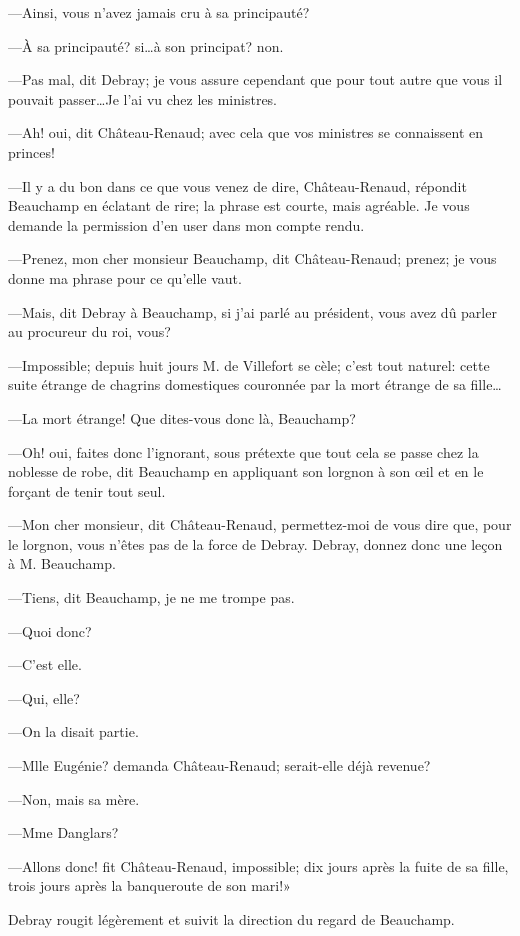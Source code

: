 —Ainsi, vous n'avez jamais cru à sa principauté? 

—À sa principauté? si\dots à son principat? non. 

—Pas mal, dit Debray; je vous assure cependant que pour tout autre que vous il pouvait passer\dots Je l'ai vu chez les ministres. 

—Ah! oui, dit Château-Renaud; avec cela que vos ministres se connaissent en princes! 

—Il y a du bon dans ce que vous venez de dire, Château-Renaud, répondit Beauchamp en éclatant de rire; la phrase est courte, mais agréable. Je vous demande la permission d'en user dans mon compte rendu. 

—Prenez, mon cher monsieur Beauchamp, dit Château-Renaud; prenez; je vous donne ma phrase pour ce qu'elle vaut. 

—Mais, dit Debray à Beauchamp, si j'ai parlé au président, vous avez dû parler au procureur du roi, vous? 

—Impossible; depuis huit jours M. de Villefort se cèle; c'est tout naturel: cette suite étrange de chagrins domestiques couronnée par la mort étrange de sa fille\dots 

—La mort étrange! Que dites-vous donc là, Beauchamp? 

—Oh! oui, faites donc l'ignorant, sous prétexte que tout cela se passe chez la noblesse de robe, dit Beauchamp en appliquant son lorgnon à son œil et en le forçant de tenir tout seul. 

—Mon cher monsieur, dit Château-Renaud, permettez-moi de vous dire que, pour le lorgnon, vous n'êtes pas de la force de Debray. Debray, donnez donc une leçon à M. Beauchamp. 

—Tiens, dit Beauchamp, je ne me trompe pas. 

—Quoi donc? 

—C'est elle. 

—Qui, elle? 

—On la disait partie. 

—Mlle Eugénie? demanda Château-Renaud; serait-elle déjà revenue? 

—Non, mais sa mère. 

—Mme Danglars? 

—Allons donc! fit Château-Renaud, impossible; dix jours après la fuite de sa fille, trois jours après la banqueroute de son mari!» 

Debray rougit légèrement et suivit la direction du regard de Beauchamp. 

